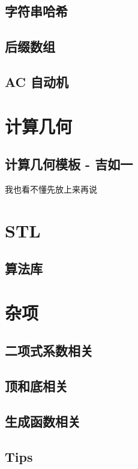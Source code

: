 \documentclass{article}
\begin{document}
\subsection{字符串哈希}



\subsection{后缀数组}



\subsection{AC 自动机}



\section{计算几何}

\subsection{计算几何模板 - 吉如一}

我也看不懂先放上来再说



\section{STL}

\subsection{算法库}



\section{杂项}

\subsection{二项式系数相关}



\subsection{顶和底相关}



\subsection{生成函数相关}



\subsection{Tips}


\end{document}

